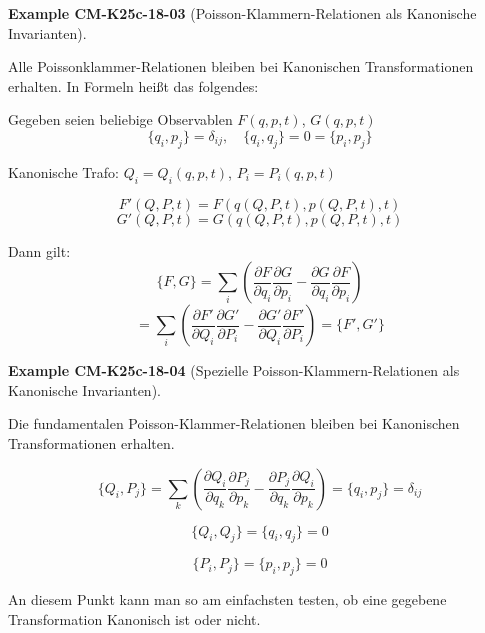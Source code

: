 \documentclass[10pt, letterpaper]{article}
\newcommand{\CustomHeading}[3]{%
  \par\medskip\noindent%
  \textbf{#1 #2} \textnormal{(#3)}.\enskip%
}
\newenvironment{EXA}[2]{\CustomHeading{Example}{#1}{#2}}{}
\begin{document}
\begin{EXA}{CM-K25c-18-03}{Poisson-Klammern-Relationen als Kanonische Invarianten}
Alle Poissonklammer-Relationen bleiben bei Kanonischen Transformationen erhalten. In Formeln heißt das folgendes:

Gegeben seien beliebige Observablen $F(q,p,t)$, $G(q,p,t)$
\[
\{q_i, p_j\} = \delta_{ij}, \quad \{q_i, q_j\} = 0 = \{p_i, p_j\}
\]

Kanonische Trafo: $Q_i = Q_i(q,p,t)$, $P_i = P_i(q,p,t)$

\[
F'(Q,P,t) = F(q(Q,P,t), p(Q,P,t), t)
\]
\[
G'(Q,P,t) = G(q(Q,P,t), p(Q,P,t), t)
\]

Dann gilt: $$\{F, G\} = \sum_i \left(\frac{\partial F}{\partial q_i} \frac{\partial G}{\partial p_i} - \frac{\partial G}{\partial q_i} \frac{\partial F}{\partial p_i}\right)$$
\[
= \sum_i \left(\frac{\partial F'}{\partial Q_i} \frac{\partial G'}{\partial P_i} - \frac{\partial G'}{\partial Q_i} \frac{\partial F'}{\partial P_i}\right) = \{F', G'\}
\]
\end{EXA}

\begin{EXA}{CM-K25c-18-04}{Spezielle Poisson-Klammern-Relationen als Kanonische Invarianten}
Die fundamentalen Poisson-Klammer-Relationen bleiben bei Kanonischen Transformationen erhalten.

$$\{Q_i, P_j\} = \sum_k \left(\frac{\partial Q_i}{\partial q_k} \frac{\partial P_j}{\partial p_k} - \frac{\partial P_j}{\partial q_k} \frac{\partial Q_i}{\partial p_k}\right) = \{q_i, p_j\} = \delta_{ij}$$

$$\{Q_i, Q_j\} = \{q_i, q_j\} = 0$$

$$\{P_i, P_j\} = \{p_i, p_j\} = 0$$

An diesem Punkt kann man so am einfachsten testen, ob eine gegebene Transformation Kanonisch ist oder nicht.
\end{EXA}
\end{document}
